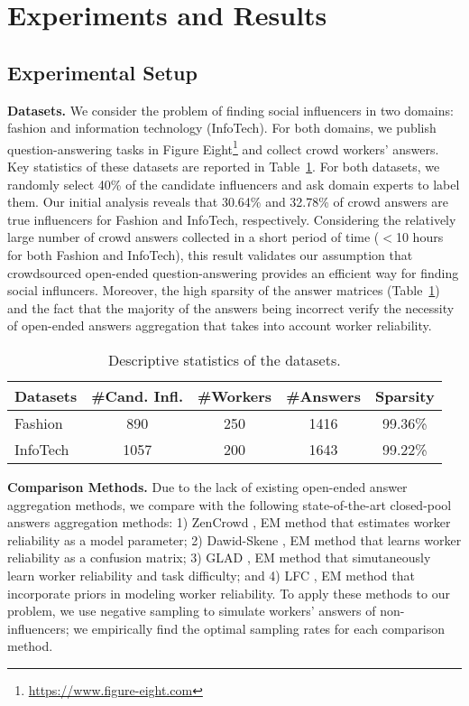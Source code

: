 \section{Experiments and Results}

\subsection{Experimental Setup}

\noindent\textbf{Datasets.} We consider the problem of finding social influencers in two domains: fashion and information technology (InfoTech). For both domains, we publish question-answering tasks in Figure Eight\footnote{\url{https://www.figure-eight.com}} and collect crowd workers' answers. Key statistics of these datasets are reported in Table~\ref{tab:datasets}. For both datasets, we randomly select 40\% of the candidate influencers and ask domain experts to label them. Our initial analysis reveals that 30.64\% and 32.78\%  of crowd answers are true influencers for Fashion and InfoTech, respectively. Considering the relatively large number of crowd answers collected in a short period of time ($<$10 hours for both Fashion and InfoTech), this result validates our assumption that crowdsourced open-ended question-answering provides an efficient way for finding social influncers. Moreover, the high sparsity of the answer matrices (Table~\ref{tab:datasets}) and the fact that the majority of the answers being incorrect verify the necessity of open-ended answers aggregation that takes into account worker reliability.

\begin{table}[!ht]
\centering \caption{Descriptive statistics of the
datasets.}\label{tab:datasets}
\addtolength{\tabcolsep}{-1mm}
\begin{tabular}{lcccc}
\toprule
    Datasets &\#Cand. Infl. &\#Workers &\#Answers &Sparsity   \\\midrule
    Fashion & 890 & 250 & 1416  & 99.36\% \\
    InfoTech & 1057 & 200 &1643 & 99.22\% \\
\bottomrule
\end{tabular}
\end{table}

\smallskip
\noindent\textbf{Comparison Methods.} Due to the lack of existing open-ended answer aggregation methods, we compare with the following state-of-the-art closed-pool answers aggregation methods: 1) ZenCrowd \cite{demartini2012zencrowd}, EM method that estimates worker reliability as a model parameter; 2) Dawid-Skene \cite{dawid1979maximum}, EM method that learns worker reliability as a confusion matrix; 3) GLAD \cite{whitehill2009whose}, EM method that simutaneously learn worker reliability and task difficulty; and 4) LFC \cite{raykar2010learning}, EM method 
that incorporate priors in modeling worker reliability. To apply these methods to our problem, we use negative sampling to simulate workers' answers of non-influencers; we empirically find the optimal sampling rates for each comparison method. 

